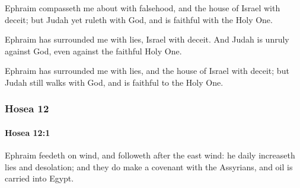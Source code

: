 			\begin{versebox}
					\item[BHS] 
					\item[LXX] 
					\item[ASV] Ephraim compasseth me about with falsehood, and the house of Israel with deceit; but Judah yet ruleth with God, and is faithful with the Holy One.
					\item[NIV] Ephraim has surrounded me with lies, Israel with deceit. And Judah is unruly against God, even against the faithful Holy One.
					\item[NRSV] Ephraim has surrounded me with lies, and the house of Israel with deceit; but Judah still walks with God, and is faithful to the Holy One.
			\end{versebox}
	\subsubsection{Hosea 12} %
		\label{HOSEA-12}

		\paragraph{Hosea 12:1} %
			\label{HOSEA-12-1}

			Ephraim feedeth on wind, and followeth after the east wind: he daily increaseth lies and desolation; and they do make a covenant with the Assyrians, and oil is carried into Egypt.

